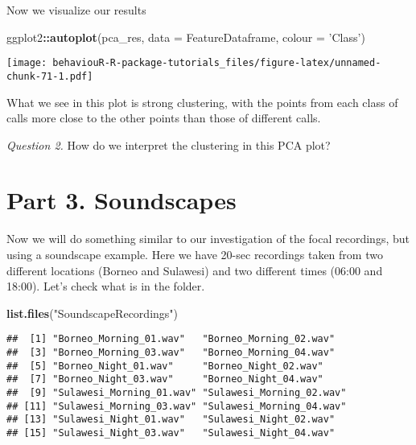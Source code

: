 \documentclass[]{book}
\newenvironment{Shaded}{\begin{snugshade}}{\end{snugshade}}
\newcommand{\DataTypeTok}[1]{\textcolor[rgb]{0.13,0.29,0.53}{#1}}
\newcommand{\KeywordTok}[1]{\textcolor[rgb]{0.13,0.29,0.53}{\textbf{#1}}}
\newcommand{\NormalTok}[1]{#1}
\newcommand{\OperatorTok}[1]{\textcolor[rgb]{0.81,0.36,0.00}{\textbf{#1}}}
\newcommand{\StringTok}[1]{\textcolor[rgb]{0.31,0.60,0.02}{#1}}
\begin{document}
Now we visualize our results

\begin{Shaded}
\begin{Highlighting}[]
\NormalTok{ggplot2}\OperatorTok{::}\KeywordTok{autoplot}\NormalTok{(pca_res, }\DataTypeTok{data =}\NormalTok{ FeatureDataframe, }
         \DataTypeTok{colour =} \StringTok{'Class'}\NormalTok{)}
\end{Highlighting}
\end{Shaded}

\texttt{[image: behaviouR-R-package-tutorials\_files/figure-latex/unnamed-chunk-71-1.pdf]}

What we see in this plot is strong clustering, with the points from each class of calls more close to the other points than those of different calls.

\emph{Question 2.} How do we interpret the clustering in this PCA plot?

\hypertarget{part-3.-soundscapes}{%
\section*{Part 3. Soundscapes}\label{part-3.-soundscapes}}

Now we will do something similar to our investigation of the focal recordings, but using a soundscape example. Here we have 20-sec recordings taken from two different locations (Borneo and Sulawesi) and two different times (06:00 and 18:00). Let's check what is in the folder.

\begin{Shaded}
\begin{Highlighting}[]
\KeywordTok{list.files}\NormalTok{(}\StringTok{"SoundscapeRecordings"}\NormalTok{)}
\end{Highlighting}
\end{Shaded}

\begin{verbatim}
##  [1] "Borneo_Morning_01.wav"   "Borneo_Morning_02.wav"  
##  [3] "Borneo_Morning_03.wav"   "Borneo_Morning_04.wav"  
##  [5] "Borneo_Night_01.wav"     "Borneo_Night_02.wav"    
##  [7] "Borneo_Night_03.wav"     "Borneo_Night_04.wav"    
##  [9] "Sulawesi_Morning_01.wav" "Sulawesi_Morning_02.wav"
## [11] "Sulawesi_Morning_03.wav" "Sulawesi_Morning_04.wav"
## [13] "Sulawesi_Night_01.wav"   "Sulawesi_Night_02.wav"  
## [15] "Sulawesi_Night_03.wav"   "Sulawesi_Night_04.wav"
\end{verbatim}
\end{document}
